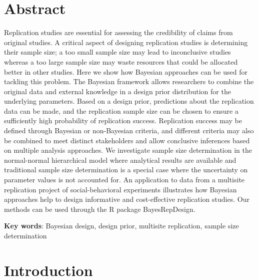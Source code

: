 \section*{Abstract}

Replication studies are essential for assessing the credibility of claims from
original studies. A critical aspect of designing replication studies is
determining their sample size; a too small sample size may lead to inconclusive
studies whereas a too large sample size may waste resources that could be
allocated better in other studies. Here we show how Bayesian approaches can be
used for tackling this problem. The Bayesian framework allows researchers to
combine the original data and external knowledge in a design prior distribution
for the underlying parameters. Based on a design prior, predictions about the
replication data can be made, and the replication sample size can be chosen to
ensure a sufficiently high probability of replication success. Replication
success may be defined through Bayesian or non-Bayesian criteria, and different
criteria may also be combined to meet distinct stakeholders and allow conclusive
inferences based on multiple analysis approaches. We investigate sample size
determination in the normal-normal hierarchical model where analytical results
are available and traditional sample size determination is a special case where
the uncertainty on parameter values is not accounted for. An application to data
from a multisite replication project of social-behavioral experiments
illustrates how Bayesian approaches help to design informative and
cost-effective replication studies. Our methods can be used through the R
package BayesRepDesign.

\textbf{Key words}: Bayesian design, design prior, multisite replication, sample
size determination



\section{Introduction}

